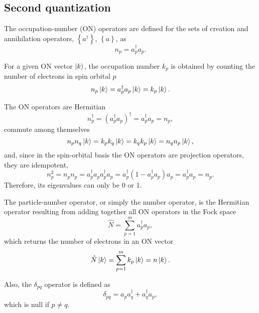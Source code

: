 \subsection{Second quantization} %
\label{sec:Second quantization}

The occupation-number (ON) operators are defined for the sets
of creation and annihilation operators, $\left\{ a^{\dagger} \right\}$, 
$\left\{ a \right\}$, as
\begin{equation}
    n_p = a_p^{\dagger} a_p
    .
\end{equation}

For a given ON vector $\Ket{k}$, the occupation number $k_p$ is obtained by
counting the number of electrons in spin orbital $p$
\begin{equation}
    n_p \Ket{k} =
    a_p^{\dagger} a_p \Ket{k} =
    k_p \Ket{k}
    .
\end{equation}

The ON operators are Hermitian 
\begin{equation}
    n_p^{\dagger} =
    \left( a_p^{\dagger} a_p \right)^{\dagger} =
    a_p^{\dagger} a_p =
    n_p
    ,
\end{equation}
commute among themselves 
\begin{equation}
    n_p n_q \Ket{k} =
    k_p k_q \Ket{k} =
    k_q k_p \Ket{k} =
    n_q n_p \Ket{k}
    ,
\end{equation}
and,
since in the spin-orbital basis the ON operators are projection operators,
they are idempotent, 
\begin{equation}
    n_p^2 =
    n_p n_p =
    a_p^{\dagger} a_p a_p^{\dagger} a_p =
    a_p^{\dagger} \left( 1 - a_p^{\dagger} a_p \right) a_p =
    a_p^{\dagger} a_p =
    n_p
    .
\end{equation}
Therefore, its eigenvalues can only be 0 or 1.

The particle-number operator, or simply the number operator, is the Hermitian
operator resulting from adding together all ON operators in the Fock space 
\begin{equation}
    \hat{N} =
    \sum_{p=1}^{m} a_p^{\dagger} a_p
    ,
\end{equation}
which returns the number of electrons in an ON vector 
\begin{equation}
    \hat{N} \Ket{k} =
    \sum_{p=1}^{m} k_p \Ket{k} =
    n \Ket{k}
    .
\end{equation}

Also, the $\delta_{pq}$ operator is defined as
\begin{equation}
    \delta_{pq} = a_p a_q^{\dagger} + a_q^{\dagger} a_p
    ,
\end{equation} 
which is null if $p \not= q$.

